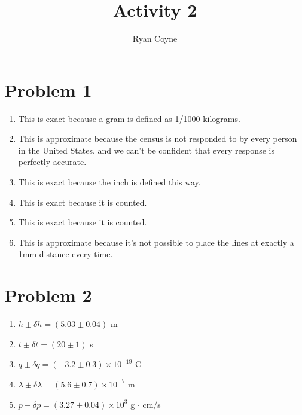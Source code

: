 \documentclass[12pt]{article}
\begin{document}
    \title{Activity 2}
    \author{Ryan Coyne}
    \maketitle

    \section*{Problem 1}

    \begin{enumerate}
        \item This is exact because a gram is defined as 1/1000 kilograms.
        \item This is approximate because the census is not responded to by every person in the United States, and we can't be confident that every response is perfectly accurate.
        \item This is exact because the inch is defined this way.
        \item This is exact because it is counted.
        \item This is exact because it is counted.
        \item This is approximate because it's not possible to place the lines at exactly a 1mm distance every time.
    \end{enumerate}

    \section*{Problem 2}
    \begin{enumerate}
        \item \(h\pm\delta h = (5.03\pm0.04)\) m
        \item \(t\pm\delta t = (20\pm1)\) s
        \item \(q\pm\delta q = (-3.2\pm0.3)\times10^{-19}\) C
        \item \(\lambda\pm\delta\lambda = (5.6\pm0.7)\times10^{-7}\) m
        \item \(p\pm\delta p = (3.27\pm0.04)\times10^3\) g \(\cdot\) cm/s 
    \end{enumerate}
    
\end{document}
